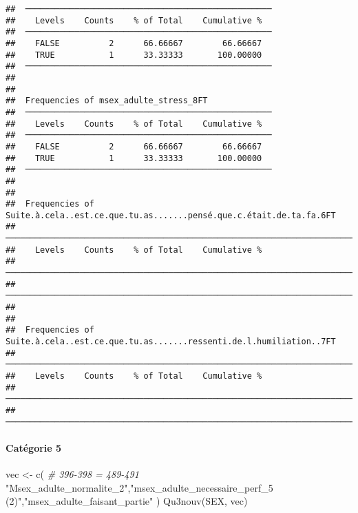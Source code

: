 \documentclass[
]{article}
\newenvironment{Shaded}{\begin{snugshade}}{\end{snugshade}}
\newcommand{\CommentTok}[1]{\textcolor[rgb]{0.56,0.35,0.01}{\textit{#1}}}
\newcommand{\FunctionTok}[1]{\textcolor[rgb]{0.00,0.00,0.00}{#1}}
\newcommand{\NormalTok}[1]{#1}
\newcommand{\OtherTok}[1]{\textcolor[rgb]{0.56,0.35,0.01}{#1}}
\newcommand{\StringTok}[1]{\textcolor[rgb]{0.31,0.60,0.02}{#1}}
\begin{document}
\begin{verbatim}
##  ────────────────────────────────────────────────── 
##    Levels    Counts    % of Total    Cumulative %   
##  ────────────────────────────────────────────────── 
##    FALSE          2      66.66667        66.66667   
##    TRUE           1      33.33333       100.00000   
##  ────────────────────────────────────────────────── 
## 
## 
##  Frequencies of msex_adulte_stress_8FT              
##  ────────────────────────────────────────────────── 
##    Levels    Counts    % of Total    Cumulative %   
##  ────────────────────────────────────────────────── 
##    FALSE          2      66.66667        66.66667   
##    TRUE           1      33.33333       100.00000   
##  ────────────────────────────────────────────────── 
## 
## 
##  Frequencies of Suite.à.cela..est.ce.que.tu.as.......pensé.que.c.était.de.ta.fa.6FT 
##  ────────────────────────────────────────────────────────────────────────────────── 
##    Levels    Counts    % of Total    Cumulative %   
##  ────────────────────────────────────────────────────────────────────────────────── 
##  ────────────────────────────────────────────────────────────────────────────────── 
## 
## 
##  Frequencies of Suite.à.cela..est.ce.que.tu.as.......ressenti.de.l.humiliation..7FT 
##  ────────────────────────────────────────────────────────────────────────────────── 
##    Levels    Counts    % of Total    Cumulative %   
##  ────────────────────────────────────────────────────────────────────────────────── 
##  ──────────────────────────────────────────────────────────────────────────────────
\end{verbatim}

\hypertarget{catuxe9gorie-5-1}{%
\paragraph{Catégorie 5}\label{catuxe9gorie-5-1}}

\begin{Shaded}
\begin{Highlighting}[]
\NormalTok{vec }\OtherTok{\textless{}{-}} \FunctionTok{c}\NormalTok{(  }\CommentTok{\# 396{-}398 = 489{-}491}
  \StringTok{"Msex\_adulte\_normalite\_2"}\NormalTok{,}\StringTok{"msex\_adulte\_necessaire\_perf\_5 (2)"}\NormalTok{,}\StringTok{"msex\_adulte\_faisant\_partie"}  
\NormalTok{)}
\FunctionTok{Qu3nouv}\NormalTok{(SEX, vec)}
\end{Highlighting}
\end{Shaded}
\end{document}
